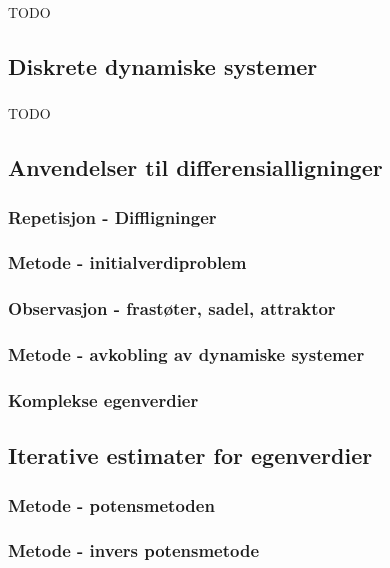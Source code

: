 \documentclass{article}
\begin{document}
      \subsubsection{}
        TODO
    \subsection{Diskrete dynamiske systemer}
      \subsubsection{}
        TODO
    \subsection{Anvendelser til differensialligninger}
      \subsubsection{Repetisjon - Diffligninger}
        
      \subsubsection{Metode - initialverdiproblem}
        
      \subsubsection{Observasjon - frastøter, sadel, attraktor}
        
      \subsubsection{Metode - avkobling av dynamiske systemer}
        
      \subsubsection{Komplekse egenverdier}
        
    \subsection{Iterative estimater for egenverdier}
      \subsubsection{Metode - potensmetoden}
        
      \subsubsection{Metode - invers potensmetode}
        
\end{document}
